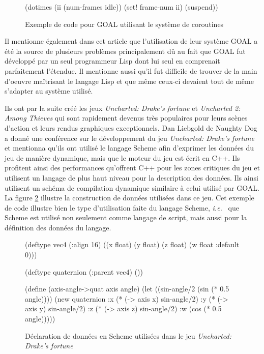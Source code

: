 \documentclass[12pt,twoside,letterpaper,francais]{book}
\newcommand{\ie}{{\textit{i.e.}~}}
\begin{document}
\begin{figure}[htb!]
  \begin{schemecode}
(dotimes (ii (num-frames idle))
  (set! frame-num ii)
  (suspend))
  \end{schemecode}
  \caption{Exemple de code pour GOAL utilisant le système de coroutines}
  \label{Rev:goal}
\end{figure}

Il mentionne également dans cet article que l'utilisation de leur
système GOAL a été la source de plusieurs problèmes principalement dû
au fait que GOAL fut développé par un seul programmeur Lisp dont lui
seul en comprenait parfaitement l'étendue. Il mentionne aussi qu'il
fut difficile de trouver de la main d'oeuvre maîtrisant le langage
Lisp et que même ceux-ci devaient tout de même s'adapter au système
utilisé.

Ils ont par la suite créé les jeux \textit{Uncharted: Drake's fortune}
et \textit{Uncharted 2: Among Thieves} qui sont rapidement devenus
très populaires pour leurs scènes d'action et leurs rendus graphiques
exceptionnels. Dan Liebgold de Naughty Dog a donné une conférence sur
le dévelop\-pement du jeu \textit{Uncharted: Drake's
  fortune}~\cite{ND_DRAKE} et mentionna qu'ils ont utilisé le langage
Scheme afin d'exprimer les données du jeu de manière dynamique,
mais que le moteur du jeu est écrit en C++. Ils profitent ainsi des
performances qu'offrent C++ pour les zones critiques du jeu et
utilisent un langage de plus haut niveau pour la description des
données. Ils ainsi utilisent un schéma de compilation dynamique
similaire à celui utilisé par GOAL. La figure \ref{Rev:Drake} illustre
la construction de données utilisées dans ce jeu. Cet exemple de code
illustre bien le type d'utilisation faite du langage Scheme, \ie
que Scheme est utilisé non seulement comme langage de script,
mais aussi pour la définition des données du langage.\\

\begin{figure}[htb!]
  \begin{schemecode}
(deftype vec4 (:align 16)
  ((x float) (y float)
   (z float) (w float :default 0)))

(deftype quaternion (:parent vec4) ())

(define (axis-angle->quat axis angle)
 (let ((sin-angle/2 (sin (* 0.5 angle))))
  (new quaternion
       :x (* (-> axis x) sin-angle/2)
       :y (* (-> axis y) sin-angle/2)
       :z (* (-> axis z) sin-angle/2)
       :w (cos (* 0.5 angle)))))
  \end{schemecode}
  \caption{Déclaration de données en Scheme utilisées dans le jeu
    \textit{Uncharted: Drake's fortune}~\cite{ND_DRAKE}}
  \label{Rev:Drake}
\end{figure}
\end{document}
